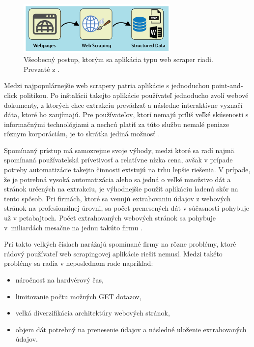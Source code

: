 \begin{figure}[hbt]
	\centering
	\includegraphics[width=0.7\textwidth]{obrazky-figures/web-scraping-using-python.png}
	\caption{Všeobecný postup, ktorým sa aplikácia typu web scraper riadi. Prevzaté z \cite{WebScrap}.}
	\label{WebScrap_img}
\end{figure}

\bigskip

Medzi najpopulárnejšie web scrapery patria aplikácie s jednoduchou point-and-click politikou. Po inštalácii takejto aplikácie používateľ jednoducho zvolí webové dokumenty, z ktorých chce extrakciu prevádzať a následne interaktívne vyznačí dáta, ktoré ho zaujímajú. Pre používateľov, ktorí nemajú príliš veľké skúsenosti s informačnými technológiami a nechcú platiť za túto službu nemalé peniaze rôznym korporáciám, je to skrátka jediná možnosť \cite{scrapers}.

\bigskip

Spomínaný prístup má samozrejme svoje výhody, medzi ktoré sa radí najmä spomínaná používateľská prívetivosť a relatívne nízka cena, avšak v prípade potreby automatizácie takejto činnosti existujú na trhu lepšie riešenia. V prípade, že je potrebná vysoká automatizácia alebo sa jedná o veľké množstvo dát a stránok určených na extrakciu, je výhodnejšie použiť aplikáciu ladenú skôr na tento spôsob. Pri firmách, ktoré sa venujú extrahovaniu údajov z webových stránok na profesionálnej úrovni, sa počet prenesených dát v súčasnosti pohybuje už v petabajtoch. Počet extrahovaných webových stránok sa pohybuje v~miliardách mesačne na jednu takúto firmu \cite{JanCurna:online}.

Pri takto veľkých číslach narážajú spomínané firmy na rôzne problémy, ktoré rádový používateľ web scrapingovej aplikácie riešiť nemusí. Medzi takéto problémy sa radia v neposlednom rade napríklad:
\begin{itemize}
    \item náročnosť na hardvérový čas,
    \item limitovanie počtu možných GET dotazov,
    \item veľká diverzifikácia architektúry webových stránok,
    \item objem dát potrebný na prenesenie údajov a následné uloženie extrahovaných údajov.
\end{itemize}

